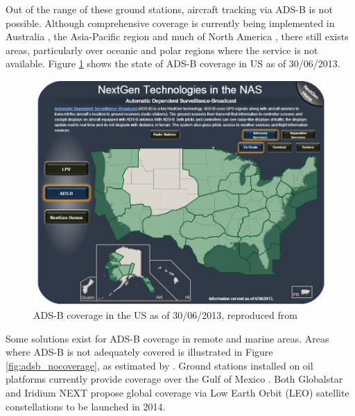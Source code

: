 Out of the range of these ground stations, aircraft tracking via ADS-B is not possible.  Although comprehensive coverage is currently being implemented in Australia \cite{ADSB_CASA_booklet}, the Asia-Pacific region \cite{ADSB_ICAO_man} and much of North America \cite{ADSB_DOT}, there still exists areas, particularly over oceanic and polar regions where the service is not available. Figure \ref{fig:adsb_us_coverage} shows the state of ADS-B coverage in US as of 30/06/2013.
\begin{figure}[H]
	\centering
	\includegraphics[scale = 0.5]{Pictures/adsb_coverage_US.jpg}
	
	\caption[ADS-B coverage in the US as of 30/06/2013]{ADS-B coverage in the US as of 30/06/2013, reproduced from \cite{NextGEN_coverage_map}}
	\label{fig:adsb_us_coverage}
\end{figure}
Some solutions exist for ADS-B coverage in remote and marine areas. Areas where ADS-B is not adequately covered is illustrated in Figure \ref{fig:adsb_nocoverage}, as  estimated by \cite{ADS-B:Aireon_brochure}. Ground stations installed on oil platforms currently provide coverage over the Gulf of Mexico \cite{ADSB_DOT}. Both Globalstar \cite{ADS-B:Globalstar_webinar} and Iridium NEXT \cite{ADS-B:Aireon_brochure} propose global coverage via Low Earth Orbit (LEO) satellite constellations to be launched in 2014.
